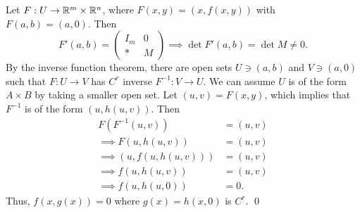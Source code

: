 \noindent Let $F : U \to \mathbb R^m \times \mathbb R^n$, where $F(x, y) = (x, f(x, y))$ with $F(a, b) = (a, 0)$. Then
\[ F'(a, b) = \left(\begin{array}{c|c} I_m & 0 \\ \hline \ast & M \end{array}\right) \implies \det F'(a, b) = \det M \neq 0. \]
By the inverse function theorem, there are open sets $U \ni (a, b)$ and $V \ni (a, 0)$ such that $F : U \to V$ has $C^r$ inverse $F^{-1} : V \to U$. We can assume $U$ is of the form $A \times B$ by taking a smaller open set. Let $(u, v) = F(x, y)$, which implies that $F^{-1}$ is of the form $(u, h(u, v))$. Then
\begin{align*}
    F(F^{-1}(u, v)) &= (u, v) \\
    \implies F(u, h(u, v)) &= (u, v) \\
    \implies (u, f(u, h(u, v))) &= (u, v) \\
    \implies f(u, h(u, v)) &= (u, v) \\
    \implies f(u, h(u, 0)) &= 0.
\end{align*}
Thus, $f(x, g(x)) = 0$ where $g(x) = h(x, 0)$ is $C^r$. \qed